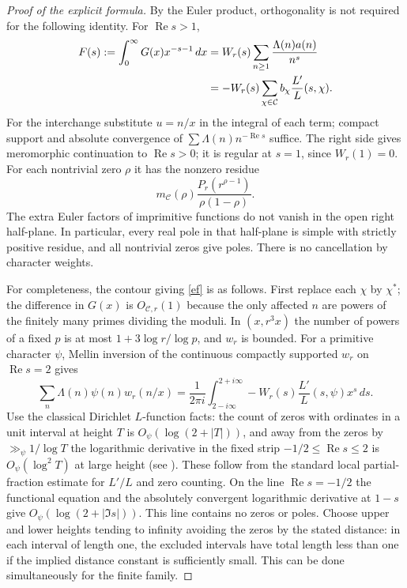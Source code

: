 \documentclass[11pt]{article}
\theoremstyle{remark}\newtheorem{remark}[theorem]{Remark}
\newcommand{\Rea}{\operatorname{Re}}
\newcommand{\C}{\mathcal C}
\begin{document}
\begin{proof}[Proof of the explicit formula]
By the Euler product, orthogonality is not required for the following identity. For $\Rea s>1$,
\begin{align}
 F(s):=\int_0^\infty G(x)x^{-s-1}\,dx
 &=W_r(s)\sum_{n\ge1}\frac{\Lambda(n)a(n)}{n^s}\notag\\
 &=-W_r(s)\sum_{\chi\in\C}b_\chi\frac{L'}{L}(s,\chi).\label{F}
\end{align}
For the interchange substitute $u=n/x$ in the integral of each term; compact support and absolute convergence of $\sum \Lambda(n)n^{-\Rea s}$ suffice. The right side gives meromorphic continuation to $\Rea s>0$; it is regular at $s=1$, since $W_r(1)=0$. For each nontrivial zero $\rho$ it has the nonzero residue
\begin{equation}\label{res}
 m_\C(\rho)\frac{P_r(r^{\rho-1})}{\rho(1-\rho)}.
\end{equation}
The extra Euler factors of imprimitive functions do not vanish in the open right half-plane. In particular, every real pole in that half-plane is simple with strictly positive residue, and all nontrivial zeros give poles. There is no cancellation by character weights.

For completeness, the contour giving \eqref{ef} is as follows. First replace each $\chi$ by $\chi^*$; the difference in $G(x)$ is $O_{\C,r}(1)$ because the only affected $n$ are powers of the finitely many primes dividing the moduli. In $(x,r^3x)$ the number of powers of a fixed $p$ is at most $1+3\log r/\log p$, and $w_r$ is bounded. For a primitive character $\psi$, Mellin inversion of the continuous compactly supported $w_r$ on $\Rea s=2$ gives
\[
 \sum_n\Lambda(n)\psi(n)w_r(n/x)=\frac{1}{2\pi i}\int_{2-i\infty}^{2+i\infty} -W_r(s)\frac{L'}{L}(s,\psi)x^s\,ds.
\]
Use the classical Dirichlet $L$-function facts: the count of zeros with ordinates in a unit interval at height $T$ is $O_\psi(\log(2+|T|))$, and away from the zeros by $\gg_\psi1/\log T$ the logarithmic derivative in the fixed strip $-1/2\le\Rea s\le2$ is $O_\psi(\log^2 T)$ at large height (see \cite{davenport,mv,kou}). These follow from the standard local partial-fraction estimate for $L'/L$ and zero counting. On the line $\Rea s=-1/2$ the functional equation and the absolutely convergent logarithmic derivative at $1-s$ give $O_\psi(\log(2+|\Im s|))$. This line contains no zeros or poles. Choose upper and lower heights tending to infinity avoiding the zeros by the stated distance: in each interval of length one, the excluded intervals have total length less than one if the implied distance constant is sufficiently small. This can be done simultaneously for the finite family.


\end{proof}
\end{document}
